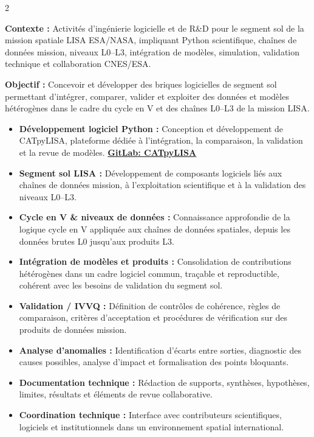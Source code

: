 \documentclass[8pt,a4paper,ragged2e,withhyper]{altacv}
\begin{document}
\begin{paracol}{2}
\divider


\textbf{Contexte :} Activités d’ingénierie logicielle et de R\&D pour le segment sol de la mission spatiale LISA ESA/NASA, impliquant Python scientifique, chaînes de données mission, niveaux L0--L3, intégration de modèles, simulation, validation technique et collaboration CNES/ESA.

\textbf{Objectif :} Concevoir et développer des briques logicielles de segment sol permettant d’intégrer, comparer, valider et exploiter des données et modèles hétérogènes dans le cadre du cycle en V et des chaînes L0--L3 de la mission LISA.

\begin{itemize}
  \item \textbf{Développement logiciel Python :} Conception et développement de CATpyLISA, plateforme dédiée à l’intégration, la comparaison, la validation et la revue de modèles.
  \textcolor{DarkPastelRed}{\href{https://gitlab.oca.eu/gboileau/lisa_l3_tools}{\bf GitLab: CATpyLISA}}
  \item \textbf{Segment sol LISA :} Développement de composants logiciels liés aux chaînes de données mission, à l’exploitation scientifique et à la validation des niveaux L0--L3.
  \item \textbf{Cycle en V \& niveaux de données :} Connaissance approfondie de la logique cycle en V appliquée aux chaînes de données spatiales, depuis les données brutes L0 jusqu’aux produits L3.
  \item \textbf{Intégration de modèles et produits :} Consolidation de contributions hétérogènes dans un cadre logiciel commun, traçable et reproductible, cohérent avec les besoins de validation du segment sol.
  \item \textbf{Validation / IVVQ :} Définition de contrôles de cohérence, règles de comparaison, critères d’acceptation et procédures de vérification sur des produits de données mission.
  \item \textbf{Analyse d’anomalies :} Identification d’écarts entre sorties, diagnostic des causes possibles, analyse d’impact et formalisation des points bloquants.
  \item \textbf{Documentation technique :} Rédaction de supports, synthèses, hypothèses, limites, résultats et éléments de revue collaborative.
  \item \textbf{Coordination technique :} Interface avec contributeurs scientifiques, logiciels et institutionnels dans un environnement spatial international.
\end{itemize}


\end{paracol}
\end{document}
